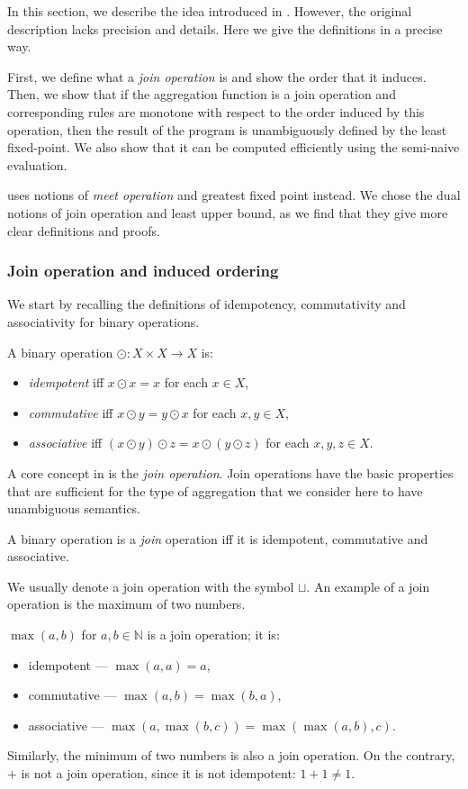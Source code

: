 In this section, we describe the idea introduced in \cite{socialite}. However, the original description lacks precision and details. Here we give the definitions in a precise way.

First, we define what a \emph{join operation} is and show the order that it induces. Then, we show that if the aggregation function is a join operation and corresponding rules are monotone with respect to the order induced by this operation, then the result of the program is unambiguously defined by the least fixed-point. We also show that it can be computed efficiently using the semi-naive evaluation.

\cite{socialite} uses notions of \emph{meet operation} and greatest fixed point instead. We chose the dual notions of join operation and least upper bound, as we find that they give more clear definitions and proofs.

\subsubsection{Join operation and induced ordering}
We start by recalling the definitions of idempotency, commutativity and associativity for binary operations.
\begin{defn}
A binary operation $\odot: X \times X \to X$ is:
\begin{itemize}
\item \emph{idempotent} iff $x \odot x = x$ for each $x \in X$,
\item \emph{commutative} iff $x \odot y = y \odot x$ for each $x, y \in X$,
\item \emph{associative} iff $(x \odot y) \odot z = x \odot (y \odot z)$ for each $x, y, z \in X$.
\end{itemize}
\end{defn}

A core concept in \datalogra is the \emph{join operation}. Join operations have the basic properties that are sufficient for the type of aggregation that we consider here to have unambiguous semantics.

\begin{defn}
A binary operation is a \emph{join} operation iff it is idempotent, commutative and associative. 
\end{defn}

We usually denote a join operation with the symbol $\sqcup$.
An example of a join operation is the maximum of two numbers.

\begin{exmp}
$\max(a, b)$ for $a, b \in \mathbb{N}$ is a join operation; it is:
\begin{itemize}
\item idempotent --- $\max(a, a) = a$,
\item commutative --- $\max(a, b) = \max(b, a)$,
\item associative --- $\max(a, \max(b, c)) = \max(\max(a, b), c)$.
\end{itemize}

Similarly, the minimum of two numbers is also a join operation. On the contrary, $+$ is not a join operation, since it is not idempotent: $1+1 \ne 1$.
\end{exmp}

